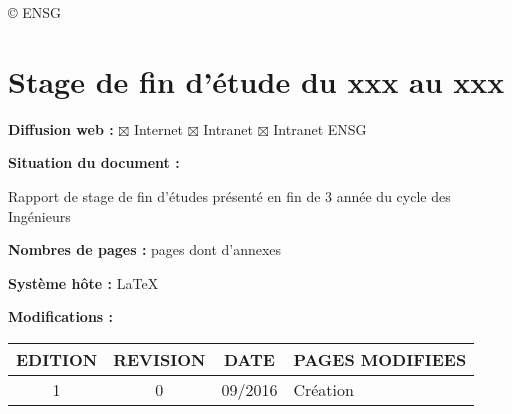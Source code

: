 \copyright \hspace{0.3cm} ENSG

\section*{Stage de fin d'étude du xxx au xxx }
\vspace{0.3cm}
\textbf{Diffusion web :} $\boxtimes$ Internet \hspace{0.2cm}$\boxtimes$ Intranet\hspace{0.2cm}
$\boxtimes$ Intranet ENSG\vspace{0.3cm}

\textbf{Situation du document :} 
\vspace{0.2cm}
\par
Rapport de stage de fin d'études présenté en fin de 3 année du cycle des Ingénieurs
\vspace{0.3cm}



\textbf{Nombres de pages :}  pages dont  d'annexes
\vspace{0.3cm}

\textbf{Système hôte :} \LaTeX
\vspace{1cm}


\textbf{Modifications :} 
\begin{center}
\begin{tabular}{|c|c|c|>{\centering}p{6.5cm}|}
\hline 
EDITION & REVISION & DATE & PAGES MODIFIEES\tabularnewline
\hline
\hline 
1 & 0 & 09/2016 & Création\tabularnewline
\hline 

\end{tabular}
\end{center}